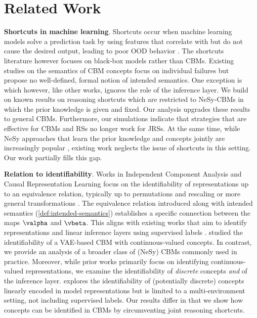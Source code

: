\section{Related Work}
\label{sec:related-work}


\textbf{Shortcuts in machine learning}.  Shortcuts occur when machine learning models solve a prediction task by using features that correlate with but do not cause the desired output, leading to poor OOD behavior \citep{geirhos2020shortcut, teso2023leveraging, ye2024spurious, steinmann2024navigating}.  The shortcuts literature however focuses on black-box models rather than CBMs.
Existing studies on the semantics of CBM concepts \citep{margeloiu2021concept, mahinpei2021promises, havasi2022addressing, raman2023concept} focus on individual failures but propose no well-defined, formal notion of intended semantics.  One exception is \citep{marconato2023interpretability} which however, like other works, ignores the role of the inference layer.
We build on known results on reasoning shortcuts \citep{li2023learning, marconato2023not, wang2023learning, umili2024neural} which are restricted to NeSy-CBMs in which the prior knowledge is given and fixed.  Our analysis upgrades these results to general CBMs.  Furthermore, our simulations indicate that strategies that are effective for CBMs and RSs no longer work for JRSs.
At the same time, while NeSy approaches that learn the prior knowledge and concepts jointly are increasingly popular \citep{wang2019satnet, yang2020neurasp, liu2023out, daniele2023deep, tang2023perception, wust2024pix2code}, existing work neglects the issue of shortcuts in this setting.  Our work partially fills this gap.


\textbf{Relation to identifiability}.  Works in Independent Component Analysis and Causal Representation Learning focus on the identifiability of representations up to an equivalence relation, typically up to permutations and rescaling \citep{khemakhem2020variational, gresele2020incomplete, von2024nonparametric} or more general transformations \citep{roeder2021linear, buchholz2022function}.
The equivalence relation introduced along with intended semantics (\cref{def:intended-semantics}) establishes a specific connection between the maps $\valpha$ and $\vbeta$. This aligns with existing works that aim to identify representations and linear inference layers using supervised labels \citep{lachapelle2023synergies, fumero2023leveraging, bing2023invariance}.  
\citet{taeb2022provable} studied the identifiability of a VAE-based CBM with continuous-valued concepts.  In contrast, we provide an analysis of a broader class of (NeSy) CBMs commonly used in practice.
Moreover, while prior works primarily focus on identifying continuous-valued representations, we examine the identifiability of \textit{discrete} concepts \textit{and} of the inference layer.
\citep{rajendran2024causal} explores the identifiability of (potentially discrete) concepts linearly encoded in model representations but is limited to a multi-environment setting, not including supervised labels.  Our results differ in that we show how concepts can be identified in CBMs by circumventing joint reasoning shortcuts.